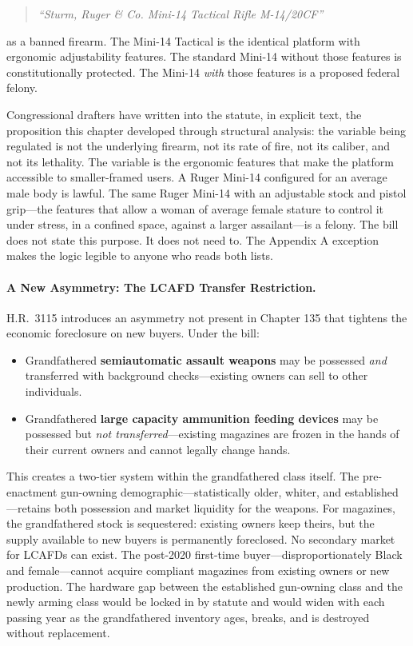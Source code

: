 \begin{quote}
\textit{``Sturm, Ruger \& Co. Mini-14 Tactical Rifle M-14/20CF''}
\end{quote}

as a banned firearm. The Mini-14 Tactical is the identical platform with ergonomic adjustability features. The standard Mini-14 without those features is constitutionally protected. The Mini-14 \textit{with} those features is a proposed federal felony.

Congressional drafters have written into the statute, in explicit text, the proposition this chapter developed through structural analysis: the variable being regulated is not the underlying firearm, not its rate of fire, not its caliber, and not its lethality. The variable is the ergonomic features that make the platform accessible to smaller-framed users. A Ruger Mini-14 configured for an average male body is lawful. The same Ruger Mini-14 with an adjustable stock and pistol grip---the features that allow a woman of average female stature to control it under stress, in a confined space, against a larger assailant---is a felony. The bill does not state this purpose. It does not need to. The Appendix A exception makes the logic legible to anyone who reads both lists.

\paragraph{A New Asymmetry: The LCAFD Transfer Restriction.}

H.R.\ 3115 introduces an asymmetry not present in Chapter 135 that tightens the economic foreclosure on new buyers. Under the bill:

\begin{itemize}
    \item Grandfathered \textbf{semiautomatic assault weapons} may be possessed \textit{and} transferred with background checks---existing owners can sell to other individuals.
    \item Grandfathered \textbf{large capacity ammunition feeding devices} may be possessed but \textit{not transferred}---existing magazines are frozen in the hands of their current owners and cannot legally change hands.
\end{itemize}

This creates a two-tier system within the grandfathered class itself. The pre-enactment gun-owning demographic---statistically older, whiter, and established---retains both possession and market liquidity for the weapons. For magazines, the grandfathered stock is sequestered: existing owners keep theirs, but the supply available to new buyers is permanently foreclosed. No secondary market for LCAFDs can exist. The post-2020 first-time buyer---disproportionately Black and female---cannot acquire compliant magazines from existing owners or new production. The hardware gap between the established gun-owning class and the newly arming class would be locked in by statute and would widen with each passing year as the grandfathered inventory ages, breaks, and is destroyed without replacement.

